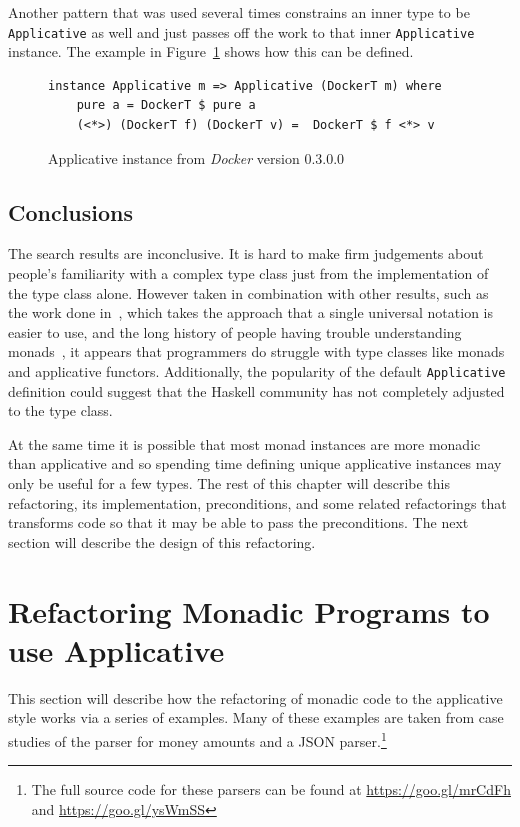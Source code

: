 Another pattern that was used several times constrains an inner type to be\\ \texttt{Applicative} as well and just passes off the work to that inner \texttt{Applicative} instance. The example in Figure~\ref{dockerApp} shows how this can be defined.

\begin{figure}[t]
\begin{lstlisting}
instance Applicative m => Applicative (DockerT m) where
    pure a = DockerT $ pure a
    (<*>) (DockerT f) (DockerT v) =  DockerT $ f <*> v
\end{lstlisting}
\caption{Applicative instance from \textit{Docker} version 0.3.0.0}
\label{dockerApp}
\end{figure}

\subsection{Conclusions}

The search results are inconclusive. It is hard to make firm judgements about people's familiarity with a complex type class just from the implementation of the type class alone. However taken in combination with other results, such as the work done in~\cite{applicativeDo}, which takes the approach that a single universal notation is easier to use, and the long history of people having trouble understanding monads~\citep{monadTutorialFallacy}, it appears that programmers do struggle with type classes like monads and applicative functors. Additionally, the popularity of the default \texttt{Applicative} definition could suggest that the Haskell community has not completely adjusted to the type class.

At the same time it is possible that most monad instances are more monadic than applicative and so spending time defining unique applicative instances may only be useful for a few types. The rest of this chapter will describe this refactoring, its implementation, preconditions, and some related refactorings that transforms code so that it may be able to pass the preconditions. The next section will describe the design of this refactoring.

\section{Refactoring Monadic Programs to use Applicative}
\label{sec:appRefact}

This section will describe how the refactoring of monadic code to the applicative style works via a series of examples. Many of these examples are taken from case studies of the parser for money amounts and a JSON parser.\footnote{The full source code for these parsers can be found at \url{https://goo.gl/mrCdFh} and \url{https://goo.gl/ysWmSS}} 

